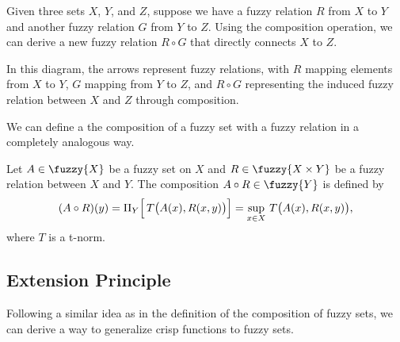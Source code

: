 

Given three sets \(X\), \(Y\), and \(Z\), suppose we have a fuzzy relation \(R\) from \(X\) to \(Y\) and another fuzzy relation \(G\) from \(Y\) to \(Z\). Using the composition operation, we can derive a new fuzzy relation \(R \circ G\) that directly connects \(X\) to \(Z\).

\noindent
\begin{minipage}{0.7\textwidth}
In this diagram, the arrows represent fuzzy relations, with \(R\) mapping elements from \(X\) to \(Y\), \(G\) mapping from \(Y\) to \(Z\), and \(R \circ G\) representing the induced fuzzy relation between \(X\) and \(Z\) through composition.\\
\end{minipage}%
\begin{minipage}{0.3\textwidth}
  \begin{center}
  \end{center}

\end{minipage}


We can define a the composition of a fuzzy set with a fuzzy relation in a completely analogous way. 

\begin{definition}
    Let \( A \in \fuzzy{X} \) be a fuzzy set on \(X\) and \( R \in \fuzzy{X \times Y} \) be a fuzzy relation between \(X\) and \(Y\). The composition \( A \circ R \in \fuzzy{Y} \) is defined by
    \[
    (A \circ R)(y) = \Pi_{Y}\Bigl[\, T\bigl( A(x), R(x,y) \bigr) \Bigr] = \sup_{x \in X}\, T\bigl( A(x), R(x,y) \bigr),
    \]
    where \(T\) is a t-norm.
\end{definition}

\subsection{Extension Principle}

Following a similar idea as in the definition of the composition of fuzzy sets, we can derive a way to generalize crisp functions to fuzzy sets.\\

